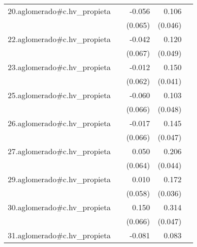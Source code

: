 {\begin{longtable}{l*{4}{D{.}{.}{-1}}}
\addlinespace
20.aglomerado#c.hv\_propieta&                     &      -0.056         &       0.106\sym{*}  &                     \\
            &                     &     (0.065)         &     (0.046)         &                     \\
\addlinespace
22.aglomerado#c.hv\_propieta&                     &      -0.042         &       0.120\sym{*}  &                     \\
            &                     &     (0.067)         &     (0.049)         &                     \\
\addlinespace
23.aglomerado#c.hv\_propieta&                     &      -0.012         &       0.150\sym{***}&                     \\
            &                     &     (0.062)         &     (0.041)         &                     \\
\addlinespace
25.aglomerado#c.hv\_propieta&                     &      -0.060         &       0.103\sym{*}  &                     \\
            &                     &     (0.066)         &     (0.048)         &                     \\
\addlinespace
26.aglomerado#c.hv\_propieta&                     &      -0.017         &       0.145\sym{**} &                     \\
            &                     &     (0.066)         &     (0.047)         &                     \\
\addlinespace
27.aglomerado#c.hv\_propieta&                     &       0.050         &       0.206\sym{***}&                     \\
            &                     &     (0.064)         &     (0.044)         &                     \\
\addlinespace
29.aglomerado#c.hv\_propieta&                     &       0.010         &       0.172\sym{***}&                     \\
            &                     &     (0.058)         &     (0.036)         &                     \\
\addlinespace
30.aglomerado#c.hv\_propieta&                     &       0.150\sym{*}  &       0.314\sym{***}&                     \\
            &                     &     (0.066)         &     (0.047)         &                     \\
\addlinespace
31.aglomerado#c.hv\_propieta&                     &      -0.081         &       0.083         &                     \\

\end{longtable}}
